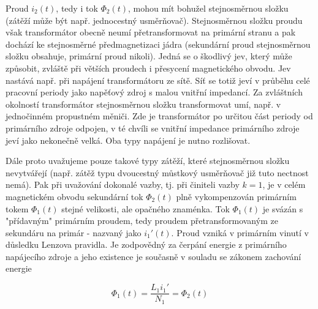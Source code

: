 {      %

      Proud $i_2(t)$, tedy i tok $\Phi_2(t)$, mohou mít bohužel stejnosměrnou složku (zátěží může 
      být např. jednocestný usměrňovač). Stejno\-směr\-nou složku prou\-du však transformátor 
      obecně neumí pře\-trans\-form\-ovat na primární stranu a pak do\-chází ke stejnosměrné 
      před\-magnet\-izaci jádra (sekundární proud stejno\-směr\-nou složku obsahuje, primární proud 
      nikoli). Jedná se o škodlivý jev, který může způsobit, zvláště při větších proudech i 
      přesycení magnetického obvodu. Jev nastává např. při napájení transformátoru ze sítě. Síť se 
      totiž jeví v průběhu celé pracovní periody jako napěťový zdroj s malou vnitřní impedancí. Za 
      zvláštních okolností transformátor stejnosměrnou složku transformovat umí, např. v 
      jednočinném propustném měniči. Zde je transformátor po určitou část periody od primárního 
      zdroje odpojen, v té chvíli se vnitřní impedance primárního zdroje jeví jako nekonečně 
      velká. Oba typy napájení je nutno rozlišovat.

      Dále proto uvažujeme pouze takové typy zátěží, které stejnosměrnou složku ne\-vy\-tvá\-ře\-jí 
      (např. zátěž typu dvoucestný můstkový usměrňovač již tuto nectnost nemá). Pak při uvažování 
      dokonalé vazby, tj. při činiteli vazby $k=1$, je v celém magnetickém obvodu sekundární tok 
      $\Phi_2(t)$ plně vykompenzován primárním tokem $\Phi_1(t)$ stejné velikosti, ale opačného 
      znaménka. Tok $\Phi_1(t)$ je svázán s "přídavným" primárním proudem, tedy proudem 
      pře\-trans\-formovaným ze sekundáru na primár - nazvaný jako $i_1'(t)$. Proud vzniká v 
      primárním vinutí v důsledku Lenzova pravidla. Je zodpovědný za čerpání energie z primárního 
      napájecího zdroje a jeho existence je současně v souladu se zákonem zachování energie

      \begin{equation}\label{es:eq_zachovani_energie}
        \Phi_1(t)=\frac{L_1i_1'}{N_1}=\Phi_2(t)
      \end{equation}

}
